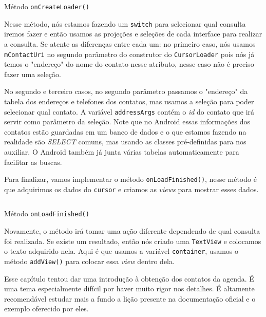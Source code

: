 \documentclass[a4paper,12pt,brazil,oneside]{book}
\begin{document}
\begin{singlespace}
		 \begin{listing}[H]
		\inputminted[linenos=true,fontsize=\small,frame=lines, framesep=2mm, tabsize=2,numbersep=5pt]{java}{src/api/contacts/oncreateloader2.java}
		\caption{Método \texttt{onCreateLoader()}}
		\label{code:contactdetailssoncreateloader}
		\end{listing} 			
	
	Nesse método, nós estamos fazendo um \texttt{switch} para selecionar qual consulta iremos fazer e então usamos as projeções e seleções de cada interface para realizar a consulta. Se atente as diferenças entre cada um: no primeiro caso, nós usamos \texttt{mContactUri} no segundo parâmetro do construtor do \texttt{CursorLoader} pois nós já temos o "endereço" do nome do contato nesse atributo, nesse caso não é preciso fazer uma seleção.

	 No segundo e terceiro casos, no segundo parâmetro passamos o "endereço" da tabela dos endereços e telefones dos contatos, mas usamos a seleção para poder selecionar qual contato. A variável \texttt{addressArgs} contém o \emph{id} do contato que irá servir como parâmetro da seleção. Note que no Android essas informações dos contatos estão guardadas em um banco de dados e o que estamos fazendo na realidade são \emph{SELECT} comuns, mas usando as classes pré-definidas para nos auxiliar. O Android também já junta várias tabelas automaticamente para facilitar as buscas.

	Para finalizar, vamos implementar o método \texttt{onLoadFinished()}, nesse método é que adquirimos os dados do \texttt{cursor} e criamos as \emph{views} para mostrar esses dados. 

		 \begin{listing}[H]
		\inputminted[linenos=true,fontsize=\small,frame=lines, framesep=2mm, tabsize=2,numbersep=5pt]{java}{src/api/contacts/onloadfinished2.java}
		\caption{Método \texttt{onLoadFinished()}}
		\label{code:contactsdetailsonloadfinished}
		\end{listing} 			

		Novamente, o método irá tomar uma ação diferente dependendo de qual consulta foi realizada. Se existe um resultado, então nós criado uma \texttt{TextView} e colocamos o texto adquirido nela. Aqui é que usamos a variável \texttt{container}, usamos o método \texttt{addView()} para colocar essa \emph{view} dentro dela.

	
		Esse capítulo tentou dar uma introdução à obtenção dos contatos da agenda. É uma tema especialmente difícil por haver muito rigor nos detalhes. É altamente recomendável estudar mais a fundo a lição presente na documentação oficial e o exemplo oferecido por eles. 



\end{singlespace}
\end{document}
